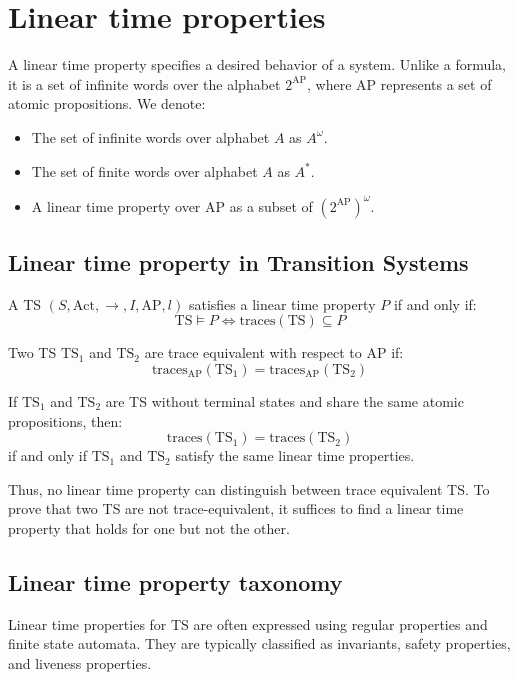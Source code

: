 \section{Linear time properties}

A linear time property specifies a desired behavior of a system. 
Unlike a formula, it is a set of infinite words over the alphabet $2^{\text{AP}}$, where $\text{AP}$ represents a set of atomic propositions.
We denote: 
\begin{itemize}
    \item The set of infinite words over alphabet $A$ as $A^\omega$. 
    \item The set of finite words over alphabet $A$ as $A^\ast$. 
    \item A linear time property over $\text{AP}$ as a subset of $\left(2^{\text{AP}}\right)^\omega$. 
\end{itemize}

\subsection{Linear time property in Transition Systems}
\begin{definition}
    A TS $(S,\text{Act},\rightarrow,I,\text{AP},l)$ satisfies a linear time property $P$ if and only if: 
    \[\text{TS}\models P\Leftrightarrow\text{traces}(\text{TS})\subseteq P\] 
\end{definition}
\begin{definition}
    Two TS $\text{TS}_1$ and $\text{TS}_2$ are trace equivalent with respect to $\text{AP}$ if: 
    \[\text{traces}_{\text{AP}}(\text{TS}_1)=\text{traces}_{\text{AP}}(\text{TS}_2)\]
\end{definition}
\begin{corollary}
    If $\text{TS}_1$ and $\text{TS}_2$ are TS without terminal states and share the same atomic propositions, then:
    \[\text{traces}(\text{TS}_1)=\text{traces}(\text{TS}_2)\] 
    if and only if $\text{TS}_1$ and $\text{TS}_2$ satisfy the same linear time properties. 
\end{corollary}
\noindent Thus, no linear time property can distinguish between trace equivalent TS. 
To prove that two TS are not trace-equivalent, it suffices to find a linear time property that holds for one but not the other.

\subsection{Linear time property taxonomy}
Linear time properties for TS are often expressed using regular properties and finite state automata. 
They are typically classified as invariants, safety properties, and liveness properties.

